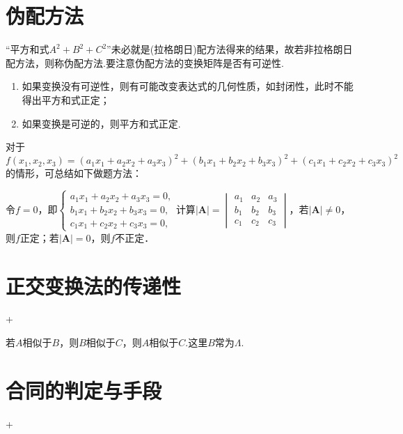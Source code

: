 \section{伪配方法}
\DTwoThree

“平方和式$A^2+B^2+C^2$”未必就是(拉格朗日)配方法得来的结果，故若非拉格朗日配方法，则称伪配方法.要注意伪配方法的变换矩阵是否有可逆性.
\begin{enumerate}
    \item 如果变换没有可逆性，则有可能改变表达式的几何性质，如封闭性，此时不能得出平方和式正定；
    \item 如果变换是可逆的，则平方和式正定.
\end{enumerate}


\begin{note}{}{}
    对于$f(x_{1},x_{2},x_{3})=(a_{1}x_{1}+a_{2}x_{2}+a_{3}x_{3})^{2}+(b_{1}x_{1}+b_{2}x_{2}+b_{3}x_{3})^{2}+(c_{1}x_{1}+c_{2}x_{2}+c_{3}x_{3})^{2}$的情形，可总结如下做题方法：

    令$f=0$，即$\begin{cases}a_{1}x_{1}+a_{2}x_{2}+a_{3}x_{3}=0,\\b_{1}x_{1}+b_{2}x_{2}+b_{3}x_{3}=0,\\c_{1}x_{1}+c_{2}x_{2}+c_{3}x_{3}=0,\end{cases}$计算$|\boldsymbol{A}|=\begin{vmatrix}a_{1}&a_{2}&a_{3}\\b_{1}&b_{2}&b_{3}\\c_{1}&c_{2}&c_{3}\end{vmatrix}$，若$|\boldsymbol{A}|\neq0$，则$f$正定；若$|\boldsymbol{A}|=0$，则$f$不正定．
\end{note}
\section{正交变换法的传递性}
\DOne+\DTwoThree

若$A$相似于$B$，则$B$相似于$C$，则$A$相似于$C$.这里$B$常为$\Lambda$.

\section{合同的判定与手段}
\DOne+\DTwoThree

